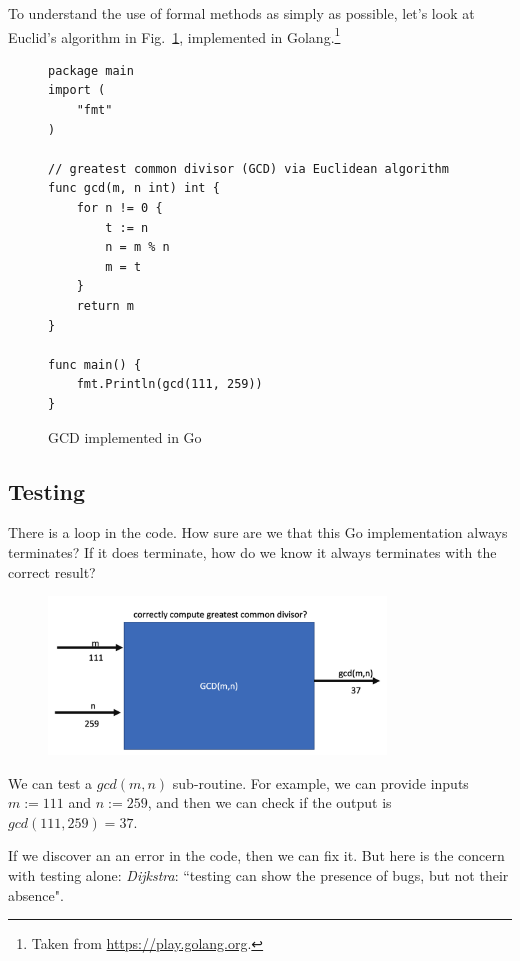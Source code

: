 \documentclass[runningheads,12pt]{article}
\begin{document}
\noindent To understand the use of formal methods as simply as possible, let's look at Euclid's algorithm in Fig.~\ref{fig:gcd-c}, implemented in Golang.\footnote{%
Taken from \url{https://play.golang.org}.} 

\begin{figure}[!htb]
\begin{framed}
\caption{GCD implemented in Go}
\label{fig:gcd-c}
\begin{Verbatim}[fontsize=\small]
package main
import (
	"fmt"
)

// greatest common divisor (GCD) via Euclidean algorithm
func gcd(m, n int) int {
	for n != 0 {
		t := n
		n = m % n
		m = t
	}
	return m
}

func main() {
	fmt.Println(gcd(111, 259))
}	
\end{Verbatim}
\end{framed}
\end{figure}


\subsection{Testing}

There is a loop in the code. How sure are we that this Go implementation always terminates? If it does terminate, how do we know it always terminates with the correct result?

\begin{figure}[hbt]
  \includegraphics[width=0.8\textwidth]{images/gcd.png}
\end{figure}


We can test a $gcd(m,n)$ sub-routine. For example, we can provide inputs $m := 111$ and $n := 259$, and then we can check if the output is $gcd(111,259) = 37$. 

If we discover an an error in the code, then we can fix it. But here is the concern with testing alone: \textit{Dijkstra}: ``testing can show the presence of bugs, but not their absence". 
\end{document}
